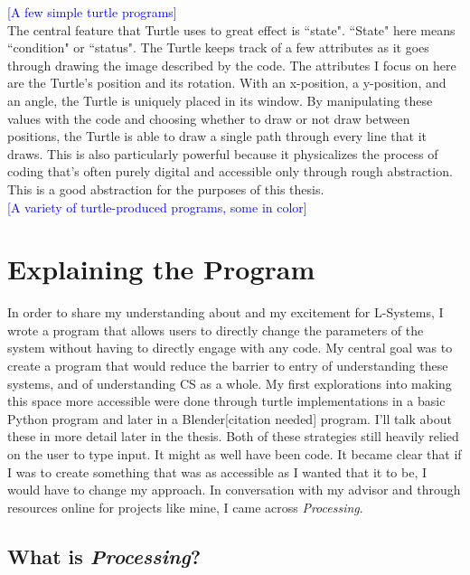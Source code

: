 \documentclass[12pt,twoside]{reedthesis}
\begin{document}
	\textcolor{blue}{[A few simple turtle programs]}\\
	
	The central feature that Turtle uses to great effect is ``state". ``State" here means ``condition" or ``status". The Turtle keeps track of a few attributes as it goes through drawing the image described by the code. The attributes I focus on here are the Turtle's position and its rotation. With an x-position, a y-position, and an angle, the Turtle is uniquely placed in its window. By manipulating these values with the code and choosing whether to draw or not draw between positions, the Turtle is able to draw a single path through every line that it draws. This is also particularly powerful because it physicalizes the process of coding that's often purely digital and accessible only through rough abstraction. This is a good abstraction for the purposes of this thesis.\\
	
	\textcolor{blue}{[A variety of turtle-produced programs, some in color]}\\


\chapter{Explaining the Program}

	In order to share my understanding about and my excitement for L-Systems, I wrote a program that allows users to directly change the parameters of the system without having to directly engage with any code. My central goal was to create a program that would reduce the barrier to entry of understanding these systems, and of understanding CS as a whole. My first explorations into making this space more accessible were done through turtle implementations in a basic Python program and later in a Blender[citation needed] program. I'll talk about these in more detail later in the thesis. Both of these strategies still heavily relied on the user to type input. It might as well have been code. It became clear that if I was to create something that was as accessible as I wanted that it to be, I would have to change my approach. In conversation with my advisor and through resources online for projects like mine, I came across \textit{Processing}.\\
	
\section{What is \textit{Processing}?}
\end{document}
